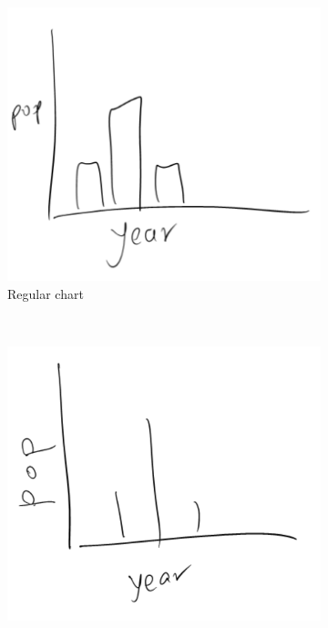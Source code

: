 	\begin{figure}[h]
        \centering
        \begin{subfigure}[b]{0.5\textwidth}
                \includegraphics[width=\textwidth]{collection1}
                \caption{Regular chart}
                \label{fig:regular}
        \end{subfigure}%
        ~ %
        \begin{subfigure}[b]{0.5\textwidth}
                \includegraphics[width=\textwidth]{collection2}

\end{subfigure}
\end{figure}
